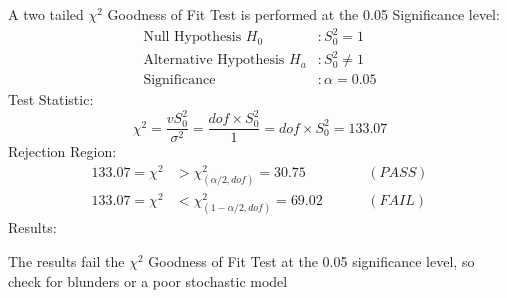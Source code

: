 A two tailed $\chi^2$ Goodness of Fit Test is performed at the 0.05 Significance level:
\begin{align*}
\text{Null Hypothesis } H_0 &: S_0^2 = 1 \\
\text{Alternative Hypothesis } H_a &: S_0^2 \neq 1 \\
\text{Significance } &: \alpha = 0.05 
\end{align*}
Test Statistic:
\[
\chi^2 = \dfrac{vS_0^2}{\sigma^2} = \dfrac{dof\times S_0^2}{1} = dof\times S_0^2 = 133.07
\]
Rejection Region:
\begin{align*}
133.07 = \chi^2 &> \chi_{(\alpha/2,dof)}^2 = 30.75 \hspace{1cm} &(PASS)\\
133.07 = \chi^2 &< \chi_{(1-\alpha/2,dof)}^2 = 69.02 \hspace{1cm} &(FAIL)
\end{align*}
Results:

The results fail the $\chi^2$ Goodness of Fit Test at the 0.05 significance level, so check for blunders or a poor stochastic model
